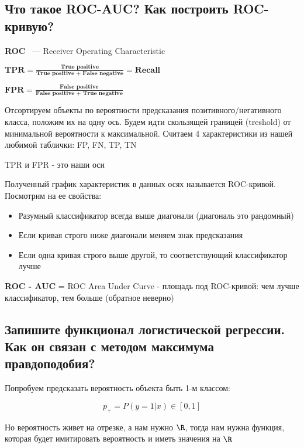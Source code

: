 \subsection{Что такое ROC-AUC? Как построить ROC-кривую?}

\Def \textbf{ROC} ~--- Receiver Operating Characteristic

\Def $\textbf{TPR} = \frac{\textbf{True positive}}{\textbf{True positive + False negative}} = \textbf{Recall}$

\Def $\textbf{FPR} = \frac{\textbf{False positive}}{\textbf{False positive + True negative}}$

Отсортируем объекты по вероятности предсказания позитивного/негативного класса, положим их на одну ось. Будем идти скользящей границей (treshold) от минимальной вероятности к максимальной. Считаем 4 характеристики из нашей любимой таблички: FP, FN, TP, TN

TPR и FPR - это наши оси

Полученный график характеристик в данных осях называется ROC-кривой. Посмотрим на ее свойства:

\begin{itemize}
    \item Разумный классификатор всегда выше диагонали (диагональ это рандомный)
    \item Если кривая строго ниже диагонали меняем знак предсказания
    \item Если одна кривая строго выше другой, то соответствующий классификатор лучше
\end{itemize}

\Def \textbf{ROC - AUC} = ROC Area Under Curve - площадь под ROC-кривой: чем лучше классификатор, тем больше (обратное неверно)








\subsection{Запишите функционал логистической регрессии. Как он связан с методом максимума
правдоподобия?}

Попробуем предсказать вероятность объекта быть 1-м классом:

$$p_+ = P(y = 1 | x) \in [0, 1]$$

Но вероятность живет на отрезке, а нам нужно $\R$, тогда нам нужна функция, которая будет имитировать вероятность и иметь значения на $\R$

